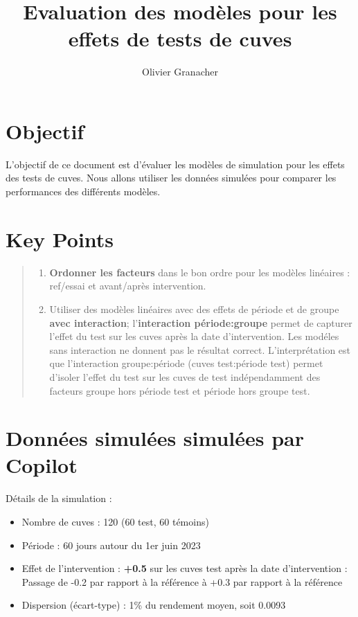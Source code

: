 \documentclass[
  letterpaper,
  DIV=11,
  numbers=noendperiod]{scrartcl}
\title{Evaluation des modèles pour les effets de tests de cuves}
\author{Olivier Granacher}
\date{}
\providecommand{\tightlist}{%
  \setlength{\itemsep}{0pt}\setlength{\parskip}{0pt}}\usepackage{longtable,booktabs,array}
\renewcommand*\contentsname{Table of contents}
\newcommand\contentsname{Table of contents}
\begin{document}
\maketitle

\renewcommand*\contentsname{Table of contents}
{
\hypersetup{linkcolor=}
\setcounter{tocdepth}{3}
\tableofcontents
}
\section{Objectif}\label{objectif}

L'objectif de ce document est d'évaluer les modèles de simulation pour
les effets des tests de cuves. Nous allons utiliser les données simulées
pour comparer les performances des différents modèles.

\section{Key Points}\label{key-points}

\begin{quote}
\begin{enumerate}
\def\labelenumi{\arabic{enumi}.}
\tightlist
\item
  \textbf{Ordonner les facteurs} dans le bon ordre pour les modèles
  linéaires : ref/essai et avant/après intervention.
\item
  Utiliser des modèles linéaires avec des effets de période et de groupe
  \textbf{avec interaction}; l'\textbf{interaction période:groupe}
  permet de capturer l'effet du test sur les cuves après la date
  d'intervention. Les modéles sans interaction ne donnent pas le
  résultat correct. L'interprétation est que l'interaction
  groupe:période (cuves test:période test) permet d'isoler l'effet du
  test sur les cuves de test indépendamment des facteurs groupe hors
  période test et période hors groupe test.
\end{enumerate}
\end{quote}

\section{Données simulées simulées par
Copilot}\label{donnuxe9es-simuluxe9es-simuluxe9es-par-copilot}

Détails de la simulation :

\begin{itemize}
\item
  Nombre de cuves : 120 (60 test, 60 témoins)
\item
  Période : 60 jours autour du 1er juin 2023
\item
  Effet de l'intervention : \textbf{+0.5} sur les cuves test après la
  date d'intervention : Passage de -0.2 par rapport à la référence à
  +0.3 par rapport à la référence
\item
  Dispersion (écart-type) : 1\% du rendement moyen, soit 0.0093
\end{itemize}
\end{document}
